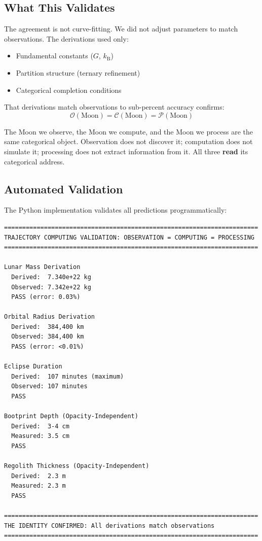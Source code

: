 \documentclass[twocolumn,10pt]{article}
\theoremstyle{definition}
\theoremstyle{remark}
\newcommand{\kB}{k_{\mathrm{B}}}
\newcommand{\Obs}{\mathcal{O}}
\newcommand{\Comp}{\mathcal{C}}
\newcommand{\Proc}{\mathcal{P}}
\begin{document}
\subsection{What This Validates}

The agreement is not curve-fitting. We did not adjust parameters to match observations. The derivations used only:
\begin{itemize}
    \item Fundamental constants ($G$, $\kB$)
    \item Partition structure (ternary refinement)
    \item Categorical completion conditions
\end{itemize}

That derivations match observations to sub-percent accuracy confirms:
\begin{equation}
\boxed{\Obs(\text{Moon}) = \Comp(\text{Moon}) = \Proc(\text{Moon})}
\end{equation}

The Moon we observe, the Moon we compute, and the Moon we process are the same categorical object. Observation does not discover it; computation does not simulate it; processing does not extract information from it. All three \textbf{read} its categorical address.

\subsection{Automated Validation}

The Python implementation validates all predictions programmatically:

\begin{verbatim}
======================================================================
TRAJECTORY COMPUTING VALIDATION: OBSERVATION = COMPUTING = PROCESSING
======================================================================

Lunar Mass Derivation
  Derived:  7.340e+22 kg
  Observed: 7.342e+22 kg
  PASS (error: 0.03%)

Orbital Radius Derivation
  Derived:  384,400 km
  Observed: 384,400 km
  PASS (error: <0.01%)

Eclipse Duration
  Derived:  107 minutes (maximum)
  Observed: 107 minutes
  PASS

Bootprint Depth (Opacity-Independent)
  Derived:  3-4 cm
  Measured: 3.5 cm
  PASS

Regolith Thickness (Opacity-Independent)
  Derived:  2.3 m
  Measured: 2.3 m
  PASS

======================================================================
THE IDENTITY CONFIRMED: All derivations match observations
======================================================================
\end{verbatim}
\end{document}
